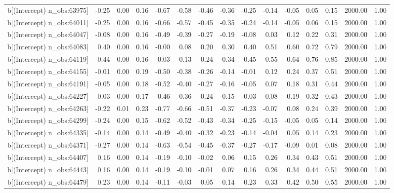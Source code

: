 \begin{table}[ht]
\begin{tabular}{rrrrrrrrrrrrrrr}
  b[(Intercept) n\_obs:63975] & -0.25 & 0.00 & 0.16 & -0.67 & -0.58 & -0.46 & -0.36 & -0.25 & -0.14 & -0.05 & 0.05 & 0.15 & 2000.00 & 1.00 \\ 
  b[(Intercept) n\_obs:64011] & -0.25 & 0.00 & 0.16 & -0.66 & -0.57 & -0.45 & -0.35 & -0.24 & -0.14 & -0.05 & 0.06 & 0.15 & 2000.00 & 1.00 \\ 
  b[(Intercept) n\_obs:64047] & -0.08 & 0.00 & 0.16 & -0.49 & -0.39 & -0.27 & -0.19 & -0.08 & 0.03 & 0.12 & 0.22 & 0.31 & 2000.00 & 1.00 \\ 
  b[(Intercept) n\_obs:64083] & 0.40 & 0.00 & 0.16 & -0.00 & 0.08 & 0.20 & 0.30 & 0.40 & 0.51 & 0.60 & 0.72 & 0.79 & 2000.00 & 1.00 \\ 
  b[(Intercept) n\_obs:64119] & 0.44 & 0.00 & 0.16 & 0.03 & 0.13 & 0.24 & 0.34 & 0.45 & 0.55 & 0.64 & 0.76 & 0.85 & 2000.00 & 1.00 \\ 
  b[(Intercept) n\_obs:64155] & -0.01 & 0.00 & 0.19 & -0.50 & -0.38 & -0.26 & -0.14 & -0.01 & 0.12 & 0.24 & 0.37 & 0.51 & 2000.00 & 1.00 \\ 
  b[(Intercept) n\_obs:64191] & -0.05 & 0.00 & 0.18 & -0.52 & -0.40 & -0.27 & -0.16 & -0.05 & 0.07 & 0.18 & 0.31 & 0.44 & 2000.00 & 1.00 \\ 
  b[(Intercept) n\_obs:64227] & -0.03 & 0.00 & 0.17 & -0.46 & -0.36 & -0.24 & -0.15 & -0.03 & 0.08 & 0.19 & 0.32 & 0.43 & 2000.00 & 1.00 \\ 
  b[(Intercept) n\_obs:64263] & -0.22 & 0.01 & 0.23 & -0.77 & -0.66 & -0.51 & -0.37 & -0.23 & -0.07 & 0.08 & 0.24 & 0.39 & 2000.00 & 1.00 \\ 
  b[(Intercept) n\_obs:64299] & -0.24 & 0.00 & 0.15 & -0.62 & -0.52 & -0.43 & -0.34 & -0.25 & -0.15 & -0.05 & 0.05 & 0.14 & 2000.00 & 1.00 \\ 
  b[(Intercept) n\_obs:64335] & -0.14 & 0.00 & 0.14 & -0.49 & -0.40 & -0.32 & -0.23 & -0.14 & -0.04 & 0.05 & 0.14 & 0.23 & 2000.00 & 1.00 \\ 
  b[(Intercept) n\_obs:64371] & -0.27 & 0.00 & 0.14 & -0.63 & -0.54 & -0.45 & -0.37 & -0.27 & -0.17 & -0.09 & 0.01 & 0.08 & 2000.00 & 1.00 \\ 
  b[(Intercept) n\_obs:64407] & 0.16 & 0.00 & 0.14 & -0.19 & -0.10 & -0.02 & 0.06 & 0.15 & 0.26 & 0.34 & 0.43 & 0.51 & 2000.00 & 1.00 \\ 
  b[(Intercept) n\_obs:64443] & 0.16 & 0.00 & 0.14 & -0.19 & -0.10 & -0.01 & 0.07 & 0.16 & 0.26 & 0.34 & 0.44 & 0.51 & 2000.00 & 1.00 \\ 
  b[(Intercept) n\_obs:64479] & 0.23 & 0.00 & 0.14 & -0.11 & -0.03 & 0.05 & 0.14 & 0.23 & 0.33 & 0.42 & 0.50 & 0.55 & 2000.00 & 1.00 \\ 

\end{tabular}
\end{table}
